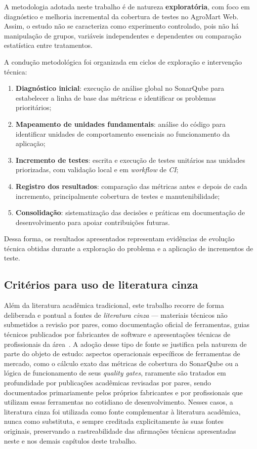 A metodologia adotada neste trabalho é de natureza \textbf{exploratória}, com foco em diagnóstico e melhoria incremental da cobertura de testes no AgroMart Web.
Assim, o estudo não se caracteriza como experimento controlado, pois não há manipulação de grupos, variáveis independentes e dependentes ou comparação estatística entre tratamentos.

A condução metodológica foi organizada em ciclos de exploração e intervenção técnica:

\begin{enumerate}
	\item \textbf{Diagnóstico inicial}: execução de análise global no SonarQube para estabelecer a linha de base das métricas e identificar os problemas prioritários;
	\item \textbf{Mapeamento de unidades fundamentais}: análise do código para identificar unidades de comportamento essenciais ao funcionamento da aplicação;
	\item \textbf{Incremento de testes}: escrita e execução de testes unitários nas unidades priorizadas, com validação local e em \textit{workflow} de \textit{CI};
	\item \textbf{Registro dos resultados}: comparação das métricas antes e depois de cada incremento, principalmente cobertura de testes e manutenibilidade;
	\item \textbf{Consolidação}: sistematização das decisões e práticas em documentação de desenvolvimento para apoiar contribuições futuras.
\end{enumerate}

Dessa forma, os resultados apresentados representam evidências de evolução técnica obtidas durante a exploração do problema e a aplicação de incrementos de teste.

\subsection{Critérios para uso de literatura cinza}

Além da literatura acadêmica tradicional, este trabalho recorre de forma deliberada e pontual a fontes de \textit{literatura cinza} — materiais técnicos não submetidos a revisão por pares, como documentação oficial de ferramentas, guias técnicos publicados por fabricantes de software e apresentações técnicas de profissionais da área~\cite{sonarqube_qualitygates,sonarsource_netguide,gallaba_sonarmetrics}.
A adoção desse tipo de fonte se justifica pela natureza de parte do objeto de estudo: aspectos operacionais específicos de ferramentas de mercado, como o cálculo exato das métricas de cobertura do SonarQube ou a lógica de funcionamento de seus \textit{quality gates}, raramente são tratados em profundidade por publicações acadêmicas revisadas por pares, sendo documentados primariamente pelos próprios fabricantes e por profissionais que utilizam essas ferramentas no cotidiano de desenvolvimento.
Nesses casos, a literatura cinza foi utilizada como fonte complementar à literatura acadêmica, nunca como substituta, e sempre creditada explicitamente às suas fontes originais, preservando a rastreabilidade das afirmações técnicas apresentadas neste e nos demais capítulos deste trabalho.

